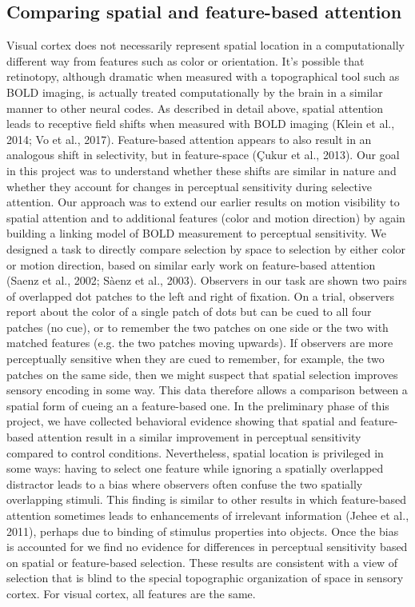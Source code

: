 \documentclass{report}
\begin{document}
\subsection{Comparing spatial and feature-based attention}
Visual cortex does not necessarily represent spatial location in a computationally different way from features such as color or orientation. It’s possible that retinotopy, although dramatic when measured with a topographical tool such as BOLD imaging, is actually treated computationally by the brain in a similar manner to other neural codes. As described in detail above, spatial attention leads to receptive field shifts when measured with BOLD imaging (Klein et al., 2014; Vo et al., 2017). Feature-based attention appears to also result in an analogous shift in selectivity, but in feature-space (Çukur et al., 2013). Our goal in this project was to understand whether these shifts are similar in nature and whether they account for changes in perceptual sensitivity during selective attention. Our approach was to extend our earlier results on motion visibility to spatial attention and to additional features (color and motion direction) by again building a linking model of BOLD measurement to perceptual sensitivity.
We designed a task to directly compare selection by space to selection by either color or motion direction, based on similar early work on feature-based attention (Saenz et al., 2002; Sàenz et al., 2003). Observers in our task are shown two pairs of overlapped dot patches to the left and right of fixation. On a trial, observers report about the color of a single patch of dots but can be cued to all four patches (no cue), or to remember the two patches on one side or the two with matched features (e.g. the two patches moving upwards). If observers are more perceptually sensitive when they are cued to remember, for example, the two patches on the same side, then we might suspect that spatial selection improves sensory encoding in some way. This data therefore allows a comparison between a spatial form of cueing an a feature-based one. In the preliminary phase of this project, we have collected behavioral evidence showing that spatial and feature-based attention result in a similar improvement in perceptual sensitivity compared to control conditions. Nevertheless, spatial location is privileged in some ways: having to select one feature while ignoring a spatially overlapped distractor leads to a bias where observers often confuse the two spatially overlapping stimuli. This finding is similar to other results in which feature-based attention sometimes leads to enhancements of irrelevant information (Jehee et al., 2011), perhaps due to binding of stimulus properties into objects. Once the bias is accounted for we find no evidence for differences in perceptual sensitivity based on spatial or feature-based selection. These results are consistent with a view of selection that is blind to the special topographic organization of space in sensory cortex. For visual cortex, all features are the same. 
\end{document}
